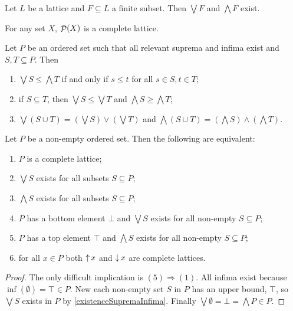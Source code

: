 \begin{lemma} \label{supInfFiniteSubsetsLattice}
Let $L$ be a lattice and $F\subseteq L$ a finite subset. Then $\bigvee F$ and $\bigwedge F$ exist. 
\end{lemma}

\begin{example}
For any set $X$, $\mathop{\mathcal{P}}(X)$ is a complete lattice.
\end{example}

\begin{lemma}
Let $P$ be an ordered set such that all relevant suprema and infima exist and $S,T\subseteq P$. Then
\begin{enumerate}
\item $\bigvee S \leq \bigwedge T$ if and only if $s\leq t$ for all $s\in S,t\in T$;
\item if $S\subseteq T$, then $\bigvee S \leq \bigvee T$ and $\bigwedge S \geq \bigwedge T$;
\item $\bigvee(S\cup T) = \left(\bigvee S\right)\vee \left(\bigvee T\right)$ and $\bigwedge(S\cup T) = \left(\bigwedge S\right)\wedge \left(\bigwedge T\right)$.
\end{enumerate}
\end{lemma}

\begin{proposition} \label{completeLatticeBasic}
Let $P$ be a non-empty ordered set. Then the following are equivalent:
\begin{enumerate}
\item $P$ is a complete lattice;
\item $\bigvee S$ exists for all subsets $S\subseteq P$;
\item $\bigwedge S$ exists for all subsets $S\subseteq P$;
\item $P$ has a bottom element $\bot$ and $\bigvee S$ exists for all non-empty $S\subseteq P$;
\item $P$ has a top element $\top$ and $\bigwedge S$ exists for all non-empty $S\subseteq P$;
\item for all $x\in P$ both $\mathop{\uparrow} x$ and $\mathop{\downarrow} x$ are complete lattices.
\end{enumerate}
\end{proposition}
\begin{proof}
The only difficult implication is $(5)\Rightarrow (1)$. All infima exist because $\inf(\emptyset) = \top \in P$. New each non-empty set $S$ in $P$ has an upper bound, $\top$, so $\bigvee S$ exists in $P$ by \ref{existenceSupremaInfima}. Finally $\bigvee \emptyset = \bot = \bigwedge P \in P$.
\end{proof}

